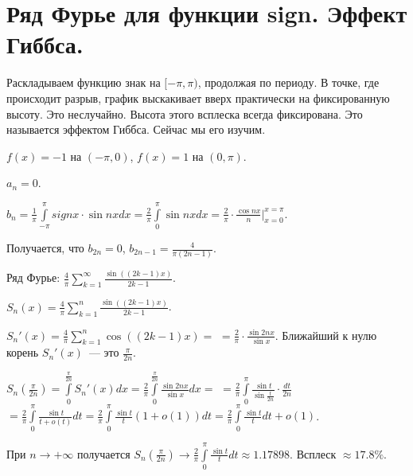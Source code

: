 \section{Ряд Фурье для функции sign. Эффект
Гиббса.}

\begin{example}
    
    Раскладываем функцию знак на $[-\pi, \pi)$, продолжая по периоду.
    В точке, где происходит разрыв, график выскакивает вверх практически на фиксированную высоту. Это неслучайно. Высота этого всплеска всегда фиксирована.
    Это называется эффектом Гиббса. Сейчас мы его изучим.


    $f(x) = -1$ на $(-\pi, 0)$,
    $f(x) = 1$ на $(0, \pi)$.

    $a_n = 0$.

    $b_n = \frac{1}{\pi} \int \limits_{-\pi}^{\pi} sign x \cdot \sin nx dx = \frac{2}{\pi}\int \limits_{0}^{\pi} \sin nx dx =
        \frac{2}{\pi} \cdot \frac{\cos nx}{n} \bigr|_{x = 0}^{x = \pi}$.

    Получается, что $b_{2n} = 0$, $b_{2n - 1} = \frac{4}{\pi(2n-1)}$.

    Ряд Фурье: $\frac{4}{\pi} \sum \limits_{k = 1}^{\infty} \frac{\sin ((2k -1)x)}{2k - 1}$.

    $S_n(x) = \frac{4}{\pi} \sum \limits_{k = 1}^{n} \frac{\sin ((2k -1)x)}{2k - 1}$.

    $S_n'(x) = \frac{4}{\pi} \sum \limits_{k = 1}^{n} \cos((2k - 1)x) =$ 
    $ = \frac{2}{\pi} \cdot \frac{\sin 2nx}{\sin x}$.
    Ближайший к нулю корень $S_n'(x)$~--- это $\frac{\pi}{2n}$.

    $S_n(\frac{\pi}{2n}) = \int \limits_{0}^{\frac{\pi}{2 n}} S_n'(x) dx = \frac{2}{\pi} \int \limits_{0}^{\frac{\pi}{2n}} \frac{\sin 2nx}{\sin x} dx = $
     $ = \frac{2}{\pi} \int \limits_{0}^{\pi} \frac{\sin t}{\sin \frac{t}{2n}} \cdot \frac{dt}{2n}$
    $ = \frac{2}{\pi} \int \limits_{0}^{\pi}  \frac{\sin t}{t + o(t)} dt = \frac{2}{\pi} \int \limits_{0}^{\pi} \frac{\sin t}{t} (1 + o(1)) dt = \frac{2}{\pi} \int \limits_{0}^{\pi} \frac{\sin t}{t} dt + o(1)$.

    При $n \to +\infty$ получается $S_n(\frac{\pi}{2 n}) \to \frac{2}{\pi} \int \limits_{0}^{\pi} \frac{\sin t}{t} dt \approx 1.17898$. Всплеск $\approx 17.8\%$.

\end{example}

\newpage

